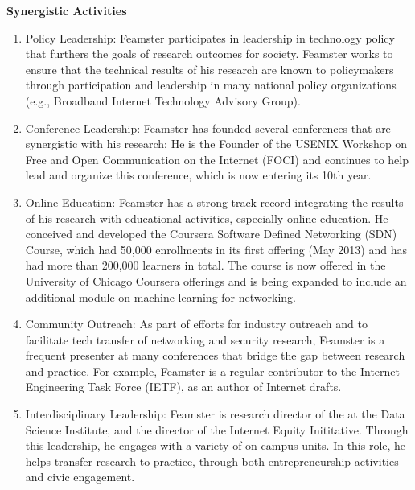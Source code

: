 \begin{center}
{\large \bf \TITLE}
\end{center}

\begin{center}
    {\bf Synergistic Activities}
\end{center}

\begin{enumerate}
    \itemsep=-1pt
    \item Policy Leadership: Feamster participates in leadership in technology policy
that
furthers the goals of research outcomes for society. Feamster works to ensure
that the technical results of his research are known to policymakers through
participation and leadership in many national policy organizations (e.g.,
Broadband Internet Technology Advisory Group).
\item Conference Leadership: Feamster has founded several conferences that are
synergistic with his research: He is the Founder of the USENIX Workshop on
Free and Open Communication on the Internet (FOCI) and continues to help lead
and organize this conference, which is now entering its 10th year.
\item Online Education: Feamster has a strong track record integrating the
results of
his research with educational activities, especially online education. He
conceived and developed the Coursera Software Defined Networking (SDN)
Course, which had 50,000 enrollments in its first offering (May 2013) and has
had more than 200,000 learners in total. The course is now offered in the
University of Chicago Coursera offerings and is being expanded to include an
additional module on machine learning for networking.
\item Community Outreach: As part of efforts for industry outreach and to
facilitate tech
transfer of networking and security research, Feamster is a frequent presenter
at
many conferences that bridge the gap between research and practice. For
example, Feamster is a regular contributor to the Internet Engineering Task
Force (IETF), as an author of Internet drafts.
\item Interdisciplinary Leadership: Feamster is research director of the at the
Data
Science Institute, and the director of the Internet Equity Inititative.
Through this
leadership, he engages with a variety of on-campus units. In this role, he
helps
transfer research to practice, through both entrepreneurship activities and
civic
engagement.
\end{enumerate}
